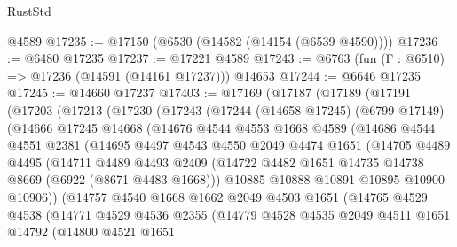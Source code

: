 \begin{lexlean}{RustStd}
\begin{coremodule}
    @4589
@17235 := @17150 (@6530 (@14582 (@14154 (@6539 @4590))))
@17236 := @6480 @17235
@17237 := @17221 @4589
@17243 := @6763 (fun (Γ : @6510) => @17236 (@14591 (@14161 @17237))) @14653
@17244 := @6646 @17235
@17245 := @14660 @17237
@17403 := @17169
    (@17187
      (@17189
        (@17191
          (@17203
            (@17213
              (@17230
                (@17243
                  (@17244
                    (@14658 @17245)
                    (@6799 @17149)
                    (@14666
                      @17245
                      @14668
                      (@14676
                        @4544
                        @4553
                        @1668
                        @4589
                        (@14686
                          @4544
                          @4551
                          @2381
                          (@14695
                            @4497
                            @4543
                            @4550
                            @2049
                            @4474
                            @1651
                            (@14705
                              @4489
                              @4495
                              (@14711
                                @4489
                                @4493
                                @2409
                                (@14722 @4482 @1651 @14735 @14738 @8669 (@6922 (@8671 @4483 @1668)))
                                @10885
                                @10888
                                @10891
                                @10895
                                @10900
                                @10906))
                            (@14757
                              @4540
                              @1668
                              @1662
                              @2049
                              @4503
                              @1651
                              (@14765
                                @4529
                                @4538
                                (@14771
                                  @4529
                                  @4536
                                  @2355
                                  (@14779
                                    @4528
                                    @4535
                                    @2049
                                    @4511
                                    @1651
                                    @14792
                                    (@14800
                                      @4521
                                      @1651

\end{coremodule}
\end{lexlean}
